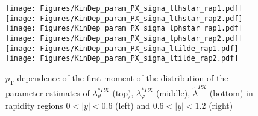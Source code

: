 \documentclass[12pt]{article}
\newcommand{\pT}{p_\mathrm{T}}
\newcommand{\absy}{\left |  y \right |}
\newcommand{\lamtildePX}{\tilde{\lambda}^{\scriptscriptstyle PX}}
\newcommand{\lamthstarPX}{\lambda^{* \scriptscriptstyle PX}_\vartheta}
\newcommand{\lamphstarPX}{\lambda^{* \scriptscriptstyle PX}_\varphi}
\begin{document}
\begin{figure}[htbp]
\centering
\texttt{[image: Figures/KinDep\_param\_PX\_sigma\_lthstar\_rap1.pdf]}
\texttt{[image: Figures/KinDep\_param\_PX\_sigma\_lthstar\_rap2.pdf]}
\texttt{[image: Figures/KinDep\_param\_PX\_sigma\_lphstar\_rap1.pdf]}
\texttt{[image: Figures/KinDep\_param\_PX\_sigma\_lphstar\_rap2.pdf]}
\texttt{[image: Figures/KinDep\_param\_PX\_sigma\_ltilde\_rap1.pdf]}
\texttt{[image: Figures/KinDep\_param\_PX\_sigma\_ltilde\_rap2.pdf]}
\caption{$\pT$ dependence of the first moment of the distribution of the parameter estimates of $\lamthstarPX$ (top), $\lamphstarPX$ (middle), $\lamtildePX$ (bottom) in rapidity regions $0<\absy<0.6$ (left) and $0.6<\absy<1.2$ (right)}
\end{figure}
\clearpage
\end{document}
